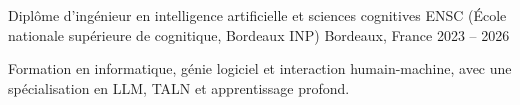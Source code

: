 
\begin{cventries}
  \cventry
    {Diplôme d’ingénieur en intelligence artificielle et sciences cognitives}
    {ENSC (École nationale supérieure de cognitique, Bordeaux INP)}
    {Bordeaux, France}
    {2023 -- 2026}
    {
      \begin{cvitems}
        \item {Formation en informatique, génie logiciel et interaction humain-machine, avec une spécialisation en LLM, TALN et apprentissage profond.}
      \end{cvitems}
    }
\end{cventries}

